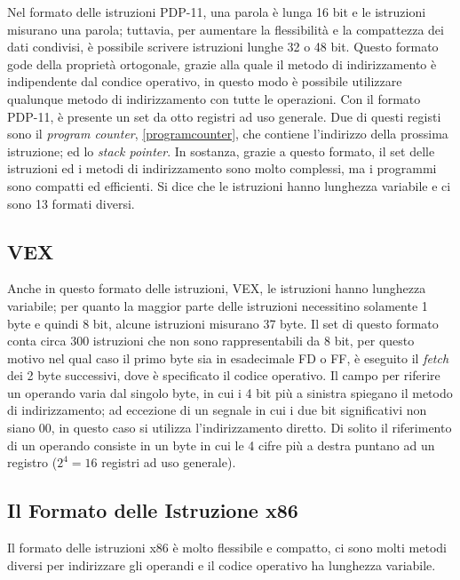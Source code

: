 \documentclass{article}
\begin{document}
Nel formato delle istruzioni PDP-11, una parola è lunga 16 bit e le istruzioni misurano una parola; tuttavia, per aumentare la flessibilità e la compattezza dei dati condivisi, è possibile scrivere istruzioni lunghe 32 o 48 bit. Questo formato gode della proprietà ortogonale, grazie alla quale il metodo di indirizzamento è indipendente dal condice operativo, in questo modo è possibile utilizzare qualunque metodo di indirizzamento con tutte le operazioni. Con il formato PDP-11, è presente un set da otto registri ad uso generale. Due di questi registi sono il \textit{program counter}, \autoref{programcounter}, che contiene l'indirizzo della prossima istruzione; ed lo \textit{stack pointer}. In sostanza, grazie a questo formato, il set delle istruzioni ed i metodi di indirizzamento sono molto complessi, ma i programmi sono compatti ed efficienti. Si dice che le istruzioni hanno lunghezza variabile e ci sono 13 formati diversi.

\subsection{VEX}

Anche in questo formato delle istruzioni, VEX, le istruzioni hanno lunghezza variabile; per quanto la maggior parte delle istruzioni necessitino solamente 1 byte e quindi 8 bit, alcune istruzioni misurano 37 byte. Il set di questo formato conta circa 300 istruzioni che non sono rappresentabili da 8 bit, per questo motivo nel qual caso il primo byte sia in esadecimale FD o FF, è eseguito il \textit{fetch} dei 2 byte successivi, dove è specificato il codice operativo. Il campo per riferire un operando varia dal singolo byte, in cui i 4 bit più a sinistra spiegano il metodo di indirizzamento; ad eccezione di un segnale in cui i due bit significativi non siano 00, in questo caso si utilizza l'indirizzamento diretto.
Di solito il riferimento di un operando consiste in un byte in cui le 4 cifre più a destra puntano ad un registro ($2^4= 16$ registri ad uso generale).


\subsection{Il Formato delle Istruzione x86}

Il formato delle istruzioni x86 è molto flessibile e compatto, ci sono molti metodi diversi per indirizzare gli operandi e il codice operativo ha lunghezza variabile.
\end{document}
